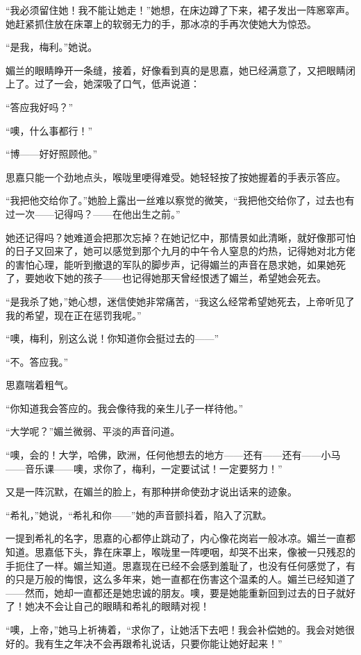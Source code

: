 \par “我必须留住她！我不能让她走！”她想，在床边蹲了下来，裙子发出一阵窸窣声。她赶紧抓住放在床罩上的软弱无力的手，那冰凉的手再次使她大为惊恐。
\par “是我，梅利。”她说。
\par 媚兰的眼睛睁开一条缝，接着，好像看到真的是思嘉，她已经满意了，又把眼睛闭上了。过了一会，她深吸了口气，低声说道：
\par “答应我好吗？”
\par “噢，什么事都行！”
\par “博——好好照顾他。”
\par 思嘉只能一个劲地点头，喉咙里哽得难受。她轻轻按了按她握着的手表示答应。
\par “我把他交给你了。”她脸上露出一丝难以察觉的微笑，“我把他交给你了，过去也有过一次——记得吗？——在他出生之前。”
\par 她还记得吗？她难道会把那次忘掉？在她记忆中，那情景如此清晰，就好像那可怕的日子又回来了，她可以感觉到那个九月的中午令人窒息的灼热，记得她对北方佬的害怕心理，能听到撤退的军队的脚步声，记得媚兰的声音在恳求她，如果她死了，要她收下她的孩子——也记得她那天曾经恨透了媚兰，希望她会死去。
\par “是我杀了她，”她心想，迷信使她非常痛苦，“我这么经常希望她死去，上帝听见了我的希望，现在正在惩罚我呢。”
\par “噢，梅利，别这么说！你知道你会挺过去的——”
\par “不。答应我。”
\par 思嘉喘着粗气。
\par “你知道我会答应的。我会像待我的亲生儿子一样待他。”
\par “大学呢？”媚兰微弱、平淡的声音问道。
\par “噢，会的！大学，哈佛，欧洲，任何他想去的地方——还有——还有——小马——音乐课——噢，求你了，梅利，一定要试试！一定要努力！”
\par 又是一阵沉默，在媚兰的脸上，有那种拼命使劲才说出话来的迹象。
\par “希礼，”她说，“希礼和你——”她的声音颤抖着，陷入了沉默。
\par 一提到希礼的名字，思嘉的心都停止跳动了，内心像花岗岩一般冰凉。媚兰一直都知道。思嘉低下头，靠在床罩上，喉咙里一阵哽咽，却哭不出来，像被一只残忍的手扼住了一样。媚兰知道。思嘉现在已经不会感到羞耻了，也没有任何感觉了，有的只是万般的悔恨，这么多年来，她一直都在伤害这个温柔的人。媚兰已经知道了——然而，她却一直都还是她忠诚的朋友。噢，要是她能重新回到过去的日子就好了！她决不会让自己的眼睛和希礼的眼睛对视！
\par “噢，上帝，”她马上祈祷着，“求你了，让她活下去吧！我会补偿她的。我会对她很好的。我有生之年决不会再跟希礼说话，只要你能让她好起来！”
